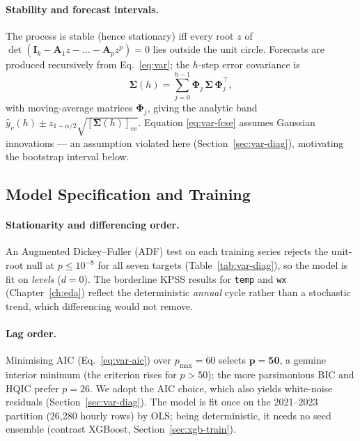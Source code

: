 \documentclass[12pt,a4paper,oneside]{report}
\begin{document}
\paragraph{Stability and forecast intervals.}
The process is stable (hence stationary) iff every root $z$ of
$\det(\mathbf{I}_k - \mathbf{A}_1 z - \dots - \mathbf{A}_p z^p)=0$ lies outside the
unit circle. Forecasts are produced recursively from Eq.~\eqref{eq:var}; the
$h$-step error covariance is
\begin{equation}
  \bm{\Sigma}(h) = \sum_{j=0}^{h-1} \bm{\Phi}_j \, \bm{\Sigma} \, \bm{\Phi}_j^{\top},
  \label{eq:var-fcse}
\end{equation}
with moving-average matrices $\bm{\Phi}_j$, giving the analytic band
$\hat{y}_v(h) \pm z_{1-\alpha/2}\sqrt{[\bm{\Sigma}(h)]_{vv}}$. Equation
\eqref{eq:var-fcse} assumes Gaussian innovations --- an assumption violated here
(Section~\ref{sec:var-diag}), motivating the bootstrap interval below.

\subsection{Model Specification and Training}
\label{sec:var-train}
\paragraph{Stationarity and differencing order.}
An Augmented Dickey--Fuller (ADF) test on each training series rejects the unit-root
null at $p \le 10^{-8}$ for all seven targets (Table~\ref{tab:var-diag}), so the
model is fit on \emph{levels} ($d=0$). The borderline KPSS results for \texttt{temp}
and \texttt{wx} (Chapter~\ref{ch:eda}) reflect the deterministic \emph{annual} cycle
rather than a stochastic trend, which differencing would not remove.

\paragraph{Lag order.}
Minimising AIC (Eq.~\eqref{eq:var-aic}) over $p_{\max}=60$ selects $\mathbf{p=50}$,
a genuine interior minimum (the criterion rises for $p>50$); the more parsimonious
BIC and HQIC prefer $p=26$. We adopt the AIC choice, which also yields white-noise
residuals (Section~\ref{sec:var-diag}). The model is fit once on the 2021--2023
partition (26{,}280 hourly rows) by OLS; being deterministic, it needs no seed
ensemble (contrast XGBoost, Section~\ref{sec:xgb-train}).
\end{document}
